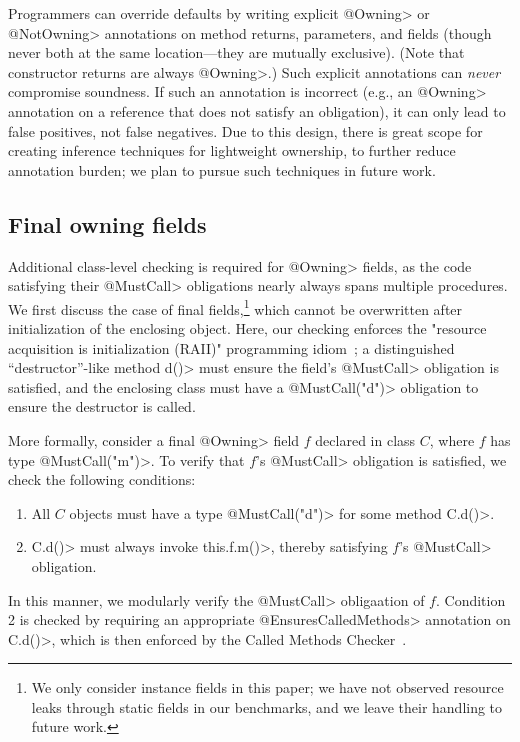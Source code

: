 Programmers can override defaults by writing explicit \<@Owning> or
\<@NotOwning> annotations on method returns, parameters, and fields (though never both at the same
location---they are mutually exclusive).  (Note that constructor returns are always
\<@Owning>.)  Such explicit annotations can
\emph{never} compromise soundness.  If such an annotation is incorrect (e.g., an
\<@Owning> annotation on a reference that does not satisfy an obligation), it
can only lead to false positives, not false negatives.  Due to this design,
there is great scope for creating inference techniques for lightweight
ownership, to further reduce annotation burden; we plan to pursue such
techniques in future work.


\subsection{Final owning fields}
\label{sec:owning-fields}

  Additional class-level checking is required for \<@Owning> fields, as the code
  satisfying their \<@MustCall> obligations nearly always spans multiple
  procedures.  We first discuss the case of final fields,\footnote{We only
  consider instance fields in this paper; we have not observed resource leaks
  through static fields in our benchmarks, and we leave their handling to future
  work.} which cannot be overwritten after initialization of the enclosing
  object.  Here, our checking enforces the "resource acquisition is
  initialization (RAII)" programming idiom~\cite{raii}; a distinguished
  ``destructor''-like method \<d()> must ensure the field's \<@MustCall> obligation is
  satisfied, and the enclosing class must have a \<@MustCall("d")> obligation to
  ensure the destructor is called.

  More formally, consider a final \<@Owning> field $f$ declared in class $C$,
  where
  $f$ has type \<@MustCall("m")>.  To
  verify that $f$'s \<@MustCall> obligation is satisfied, we check the following
  conditions:
  \begin{enumerate}
    \item All $C$ objects must have a type \<@MustCall("d")> for some method \<C.d()>.
    \item \<C.d()> must always invoke \<this.f.m()>, thereby satisfying $f$'s
    \<@MustCall> obligation.
  \end{enumerate}
  In this manner, we modularly verify the \<@MustCall> obligaation of $f$.  Condition 2 is
  checked by requiring an appropriate \<@EnsuresCalledMethods> annotation on
  \<C.d()>, which is then enforced by the Called Methods
  Checker~\cite{KelloggRSSE2020}.   

